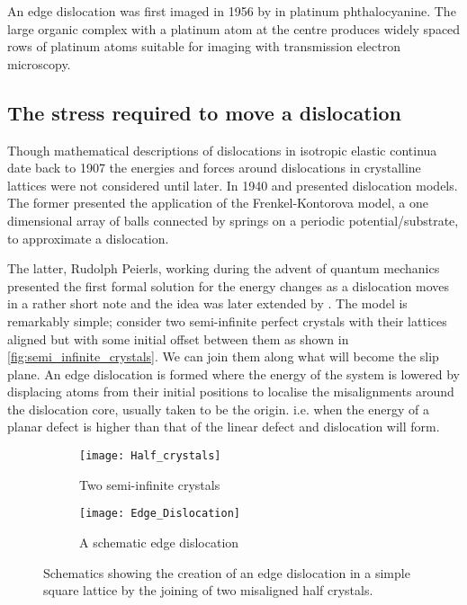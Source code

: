 An edge dislocation was first imaged in 1956 by \citet{Menter1956} in platinum phthalocyanine. The large organic complex with a platinum atom at the centre produces widely spaced rows of platinum atoms suitable for imaging with transmission electron microscopy.




\subsection{The stress required to move a dislocation}



Though mathematical descriptions of dislocations in isotropic elastic continua date back to 1907 \cite{Volterra1907} the energies and forces around dislocations in crystalline lattices were not considered until later. In 1940 \citet{Dehlinger1940} and \citet{Peierls1940} presented dislocation models. The former presented the application of the Frenkel-Kontorova model, a one dimensional array of balls connected by springs on a periodic potential/substrate, to approximate a dislocation.

The latter, Rudolph Peierls, working during the advent of quantum mechanics presented the first formal solution for the energy changes as a dislocation moves in a rather short note \cite{Peierls1940} and the idea was later extended by \citet{Nabarro1947}. The model is remarkably simple; consider two semi-infinite perfect crystals with their lattices aligned but with some initial offset between them as shown in \autoref{fig:semi_infinite_crystals}. We can join them along what will become the slip plane. An edge dislocation is formed where the energy of the system is lowered by displacing atoms from their initial positions to localise the misalignments around the dislocation core, usually taken to be the origin. i.e. when the energy of a planar defect is higher than that of the linear defect and dislocation will form.



\begin{figure}
\centering

    \begin{subfigure}{0.4\textwidth}
        \texttt{[image: Half\_crystals]}
        \caption{Two semi-infinite crystals \label{fig:semi_infinite_crystals}}
    \end{subfigure}
    
    \vspace{0.5cm}
    
    \begin{subfigure}{0.4\textwidth}
        \texttt{[image: Edge\_Dislocation]}
        \caption{A schematic edge dislocation\label{fig:joined_half_crystals}}
    \end{subfigure}

    \captionsetup{width=0.5\textwidth}
    \caption[Building an edge dislocation.]{Schematics showing the creation of an edge dislocation in a simple square lattice by the joining of two misaligned half crystals. \label{fig:edge_disloc}}
\end{figure}


